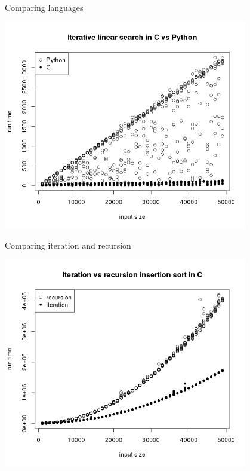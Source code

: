 \documentclass[]{beamer}
\begin{document}
\begin{frame}[t]{Comparing languages}
\begin{center}
	\includegraphics[width=0.8\textwidth]{plots/i_linear_in_c_vs_python.png}
\end{center}
\end{frame}

\begin{frame}[t]{Comparing iteration and recursion}
\begin{center}
	\includegraphics[width=0.8\textwidth]{plots/i_vs_r_insertion_in_c.png}
\end{center}
\end{frame}
\end{document}
